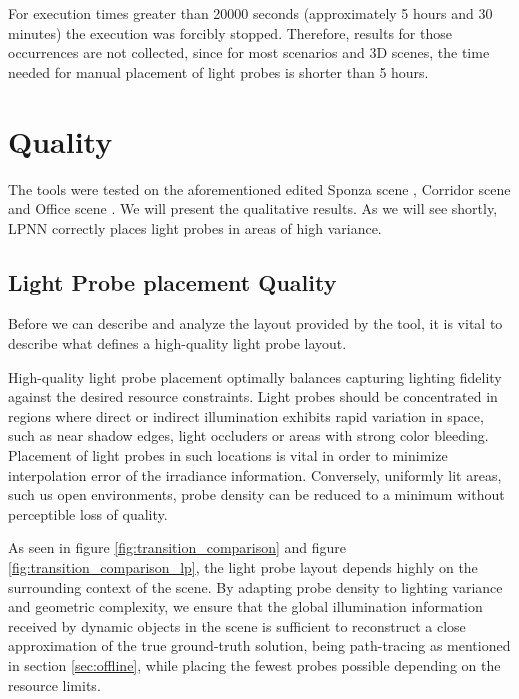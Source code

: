 For execution times greater than 20000 seconds (approximately 5 hours and 30 minutes) the execution was forcibly stopped. Therefore, results for those occurrences are not collected, since for most scenarios and 3D scenes, the time needed for manual placement of light probes is shorter than 5 hours.

\section{Quality}
\label{sec:4_quality}

The tools were tested on the aforementioned edited Sponza scene \parencite{Sponza2017}, Corridor scene \parencite{Corridor2021} and Office scene \parencite{Office2021}. We will present the qualitative results. As we will see shortly, LPNN correctly places light probes in areas of high variance.

\subsection{Light Probe placement Quality}
\label{sec:lp_quality}

Before we can describe and analyze the layout provided by the tool, it is vital to describe what defines a high-quality light probe layout.

High-quality light probe placement optimally balances capturing lighting fidelity against the desired resource constraints. Light probes should be concentrated in regions where direct or indirect illumination exhibits rapid variation in space, such as near shadow edges, light occluders or areas with strong color bleeding. Placement of light probes in such locations is vital in order to minimize interpolation error of the irradiance information. Conversely, uniformly lit areas, such us open environments, probe density can be reduced to a minimum without perceptible loss of quality.

As seen in figure \ref{fig:transition_comparison} and figure \ref{fig:transition_comparison_lp}, the light probe layout depends highly on the surrounding context of the scene. By adapting probe density to lighting variance and geometric complexity, we ensure that the global illumination information received by dynamic objects in the scene is sufficient to reconstruct a close approximation of the true ground-truth solution, being path-tracing as mentioned in section \ref{sec:offline}, while placing the fewest probes possible depending on the resource limits.

